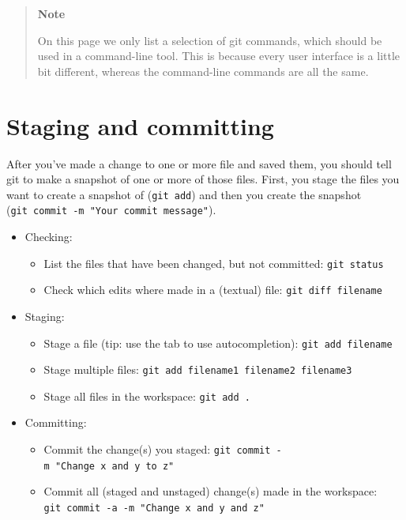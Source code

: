 \documentclass[
  letterpaper,
  DIV=11,
  numbers=noendperiod,
  oneside]{scrreprt}
\providecommand{\tightlist}{%
  \setlength{\itemsep}{0pt}\setlength{\parskip}{0pt}}
\begin{document}
\begin{tcolorbox}
\begin{quote}
\textbf{Note}

On this page we only list a selection of git commands, which should be
used in a command-line tool. This is because every user interface is a
little bit different, whereas the command-line commands are all the
same.
\end{quote}

\section{Staging and committing}\label{staging-and-committing}

After you've made a change to one or more file and saved them, you
should tell git to make a snapshot of one or more of those files. First,
you stage the files you want to create a snapshot of (\texttt{git\ add})
and then you create the snapshot
(\texttt{git\ commit\ -m\ "Your\ commit\ message"}).

\begin{itemize}
\tightlist
\item
  Checking:

  \begin{itemize}
  \tightlist
  \item
    List the files that have been changed, but not committed:
    \texttt{git\ status}
  \item
    Check which edits where made in a (textual) file:
    \texttt{git\ diff\ filename}
  \end{itemize}
\item
  Staging:

  \begin{itemize}
  \tightlist
  \item
    Stage a file (tip: use the tab to use autocompletion):
    \texttt{git\ add\ filename}
  \item
    Stage multiple files:
    \texttt{git\ add\ filename1\ filename2\ filename3}
  \item
    Stage all files in the workspace: \texttt{git\ add\ .}
  \end{itemize}
\item
  Committing:

  \begin{itemize}
  \tightlist
  \item
    Commit the change(s) you staged:
    \texttt{git\ commit\ -m\ "Change\ x\ and\ y\ to\ z"}
  \item
    Commit all (staged and unstaged) change(s) made in the workspace:
    \texttt{git\ commit\ -a\ -m\ "Change\ x\ and\ y\ and\ z"}
  \end{itemize}
\end{itemize}


\end{tcolorbox}
\end{document}
